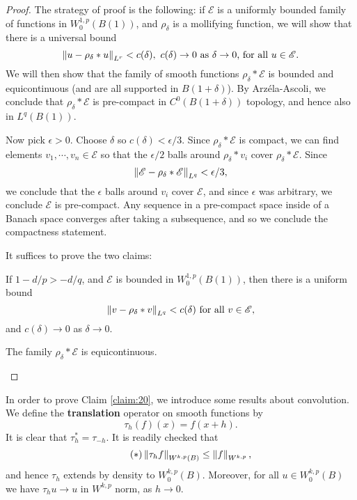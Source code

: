 \documentclass{amsart}
\begin{document}
\begin{proof}
  The strategy of proof is the following: if $\mathscr{E}$ is a uniformly bounded family of functions in $W^{1,p}_{0}(B(1))$, and $\rho_{\delta}$ is a mollifying function, we will show that there is a universal bound
  \begin{equation*}
    \left\lVert u-\rho_{\delta}\ast u\right\rVert_{L^{r}}<c(\delta),\text{ $c(\delta)\to 0$ as $\delta\to 0$, for all $u\in \mathscr{E}$}.
  \end{equation*}
  We will then show that the family of smooth functions $\rho_{\delta}\ast \mathscr{E}$ is bounded and equicontinuous (and are all supported in $B(1+\delta)$). By Arz\'ela-Ascoli, we conclude that $\rho_{\delta}\ast\mathscr{E}$ is pre-compact in $C^{0}(B(1+\delta))$ topology, and hence also in $L^{q}(B(1))$.

  Now pick $\epsilon>0$. Choose $\delta$ so $c(\delta)<\epsilon/3$. Since $\rho_{\delta}\ast \mathscr{E}$ is compact, we can find elements $v_{1},\cdots,v_{n}\in \mathscr{E}$ so that the $\epsilon/2$ balls around $\rho_{\delta}\ast v_{i}$ cover $\rho_{\delta}\ast\mathscr{E}$. Since
  \begin{equation*}
    \left\lVert\mathscr{E}-\rho_{\delta}\ast\mathscr{E}\right\rVert
    _{L^{q}}<\epsilon/3,
  \end{equation*}
  we conclude that the $\epsilon$ balls around $v_{i}$ cover $\mathscr{E}$, and since $\epsilon$ was arbitrary, we conclude $\mathscr{E}$ is pre-compact. Any sequence in a pre-compact space inside of a Banach space converges after taking a subsequence, and so we conclude the compactness statement.

  It suffices to prove the two claims:
  \begin{claim}\label{claim:20}
    If $1-d/p>-d/q$, and $\mathscr{E}$ is bounded in $W^{1,p}_{0}(B(1))$, then there is a uniform bound
    \begin{equation*}      \left\lVert v-\rho_{\delta}\ast v\right\rVert_{L^{q}}<c(\delta)\text{ for all $v\in \mathscr{E}$},
    \end{equation*}
    and $c(\delta)\to 0$ as $\delta\to 0$.
  \end{claim}
  \begin{claim}\label{claim:21}
    The family $\rho_{\delta}\ast \mathscr{E}$ is equicontinuous. 
  \end{claim}
\end{proof}
In order to prove Claim \ref{claim:20}, we introduce some results about convolution. We define the \textbf{translation} operator on smooth functions by
\begin{equation*}
  \tau_{h}(f)(x)=f(x+h).
\end{equation*}
It is clear that $\tau_{h}^{*}=\tau_{-h}$. It is readily checked that
\begin{equation*}\tag{$\ast$}
  \left\lVert\tau_{h}f\right\rVert_{W^{k,p}(B)}\le \left\lVert f\right\rVert_{W^{k,p}},
\end{equation*}
and hence $\tau_{h}$ extends by density to $W^{k,p}_{0}(B)$. Moreover, for all $u\in W^{k,p}_{0}(B)$ we have $\tau_{h}u\to u$ in $W^{k,p}$ norm, as $h\to 0$.
\end{document}
